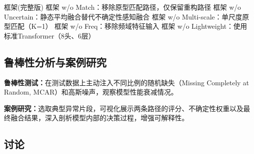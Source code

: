 \documentclass{setp-new}
\begin{document}
框架(完整版)
框架 w/o Match：移除原型匹配路径，仅保留重构路径
框架 w/o Uncertain：静态平均融合替代不确定性感知融合
框架 w/o Multi-scale：单尺度原型匹配（K=1）
框架 w/o Freq：移除频域特征输入
框架 w/o Lightweight：使用标准Transformer（8头、6层）

\subsection{鲁棒性分析与案例研究}
\textbf{鲁棒性测试：}在测试数据上主动注入不同比例的随机缺失（Missing Completely at Random, MCAR）和高斯噪声，观察模型性能衰减情况。

\textbf{案例研究：}选取典型异常片段，可视化展示两条路径的评分、不确定性权重以及最终融合结果，深入剖析模型内部的决策过程，增强可解释性。

\subsection{讨论}
\end{document}
